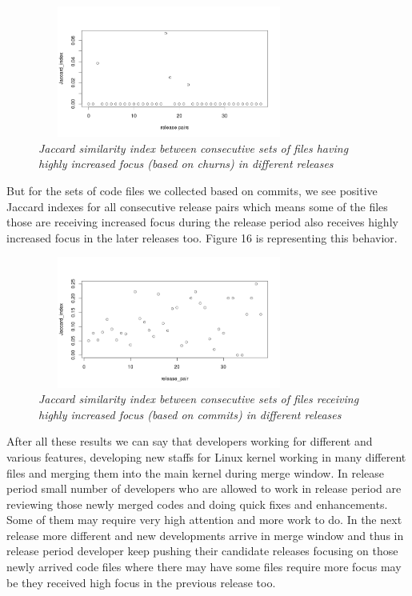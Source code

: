 \documentclass{acm_proc_article-sp}
\begin{document}
\begin{figure}
\begin{center}
\includegraphics[height=1.7in,width=3.4in]{jdRPChurnHighFocusFiles.png}
\caption{\small \sl Jaccard similarity index between consecutive sets of files having highly increased focus (based on churns) in different releases}
\end{center}
\end{figure}

But for the sets of code files we collected based on commits, we see positive Jaccard indexes for all consecutive release pairs which means some of the files those are receiving increased focus during the release period also receives highly increased focus in the later releases too. Figure 16 is representing this behavior.

\begin{figure}
\begin{center}
\includegraphics[height=1.7in,width=3.4in]{jdRPCommitHighFocusFiles.png}
\caption{\small \sl Jaccard similarity index between consecutive sets of files receiving highly increased focus (based on commits) in different releases}
\end{center}
\end{figure}

After all these results we can say that developers working for different and various features, developing new staffs for Linux kernel working in many different files and merging them into the main kernel during merge window. In release period small number of developers who are allowed to work in release period are reviewing those newly merged codes and doing quick fixes and enhancements. Some of them may require very high attention and more work to do. In the next release more different and new developments arrive in merge window and thus in release period developer keep pushing their candidate releases focusing on those newly arrived code files where there may have some files require more focus may be they received high focus in the previous release too.
\end{document}
